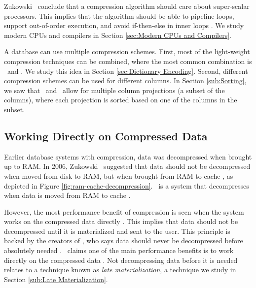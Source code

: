 Zukowski \ea~conclude that a compression algorithm should care about super-scalar processors. This implies that the algorithm should be able to pipeline loops, support out-of-order execution, and avoid if-then-else in inner loops \cite{Zukowski2006-oz}. We study modern CPUs and compilers in Section \ref{sec:Modern CPUs and Compilers}.

A database can use multiple compression schemes. First, most of the light-weight compression techniques can be combined, where the most common combination is \de~and \bp. We study this idea in Section \ref{sec:Dictionary Encoding}. Second, different compression schemes can be used for different columns. In Section \ref{sub:Sorting}, we saw that \cstore~and \vertica~allow for multiple column projections (a subset of the columns), where each projection is sorted based on one of the columns in the subset. 

\subsection{Working Directly on Compressed Data}
\label{sub:Working Directly on Compressed Data}


Earlier database systems with compression, data was decompressed when brought up to RAM. In 2006, Zukowski \ea~suggested that data should not be decompressed when moved from disk to RAM, but when brought from RAM to cache \cite{Zukowski2006-oz}, as depicted in Figure \ref{fig:ram-cache-decompression}. \monetx~is a system that decompresses when data is moved from RAM to cache \cite{Johnson2008-cp}.

However, the most performance benefit of compression is seen when the system works on the compressed data directly \cite{Lemke2010-is}. This implies that data should not be decompressed until it is materialized and sent to the user. This principle is backed by the creators of \blink, who says data should never be decompressed before absolutely needed \cite{Barber2012-xt}. \oracle~claims one of the main performance benefits is to work directly on the compressed data \cite{Oracle2015-fs}. Not decompressing data before it is needed relates to a technique known as \textit{late materialization}, a technique we study in Section \ref{sub:Late Materialization}. 

